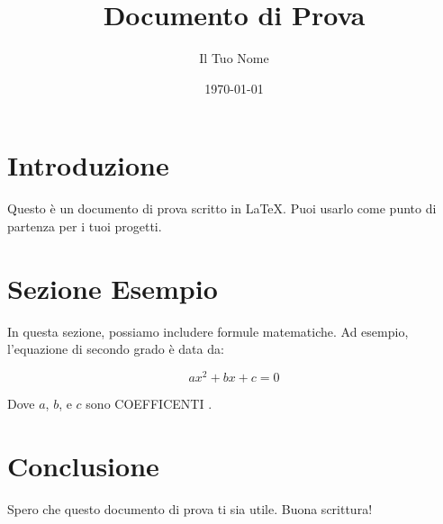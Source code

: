 \documentclass{article}
\title{Documento di Prova}
\author{Il Tuo Nome}
\date{\today}
\begin{document}
\maketitle

\section{Introduzione}
Questo è un documento di prova scritto in \LaTeX. Puoi usarlo come punto di partenza per i tuoi progetti.

\section{Sezione Esempio}
In questa sezione, possiamo includere formule matematiche. Ad esempio, l'equazione di secondo grado è data da:

\[
ax^2 + bx + c = 0
\]

Dove \(a\), \(b\), e \(c\) sono COEFFICENTI .

\section{Conclusione}
Spero che questo documento di prova ti sia utile. Buona scrittura!
\end{document}
